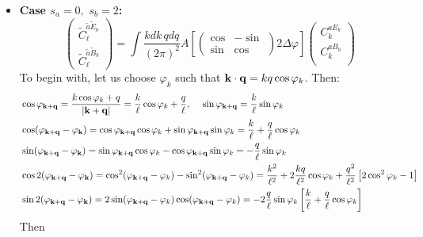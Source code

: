 \documentclass[a4paper,10pt]{article}
\begin{document}
\begin{itemize}
      \item {\bf Case $s_a=0,\,\,s_b=2$:}
        \begin{equation}
          \left(
          \begin{array}{c}
	    \tilde{C}^{\tilde{a}\tilde{E}_b}_\ell\\
	    \tilde{C}^{\tilde{a}\tilde{B}_b}_\ell
	  \end{array}\right)=\int\frac{kdk\,qdq}{(2\pi)^2}
          A\left[\left(
          \begin{array}{cc}
            \cos & -\sin\\
            \sin &  \cos
          \end{array}\right)2\Delta\varphi\right]
          \left(
          \begin{array}{c}
           C^{aE_b}_k \\
           C^{aB_b}_k \\
          \end{array}\right)
        \end{equation}
        To begin with, let us choose $\varphi_k$ such that ${\bf k}\cdot{\bf q}=kq\cos\varphi_k$. Then:
        \begin{align}
          &\cos\varphi_{{\bf k}+{\bf q}}=\frac{k\cos\varphi_k+q}{|{\bf k}+{\bf q}|}=\frac{k}{\ell}\cos\varphi_k+\frac{q}{\ell},\hspace{12pt}
          \sin\varphi_{{\bf k}+{\bf q}}=\frac{k}{\ell}\sin\varphi_k\\
          &\cos(\varphi_{{\bf k}+{\bf q}}-\varphi_{\bf k})=\cos\varphi_{{\bf k}+{\bf q}}\cos\varphi_k+\sin\varphi_{{\bf k}+{\bf q}}\sin\varphi_k=\frac{k}{\ell}+\frac{q}{\ell}\cos\varphi_k\\
          &\sin(\varphi_{{\bf k}+{\bf q}}-\varphi_{\bf k})=\sin\varphi_{{\bf k}+{\bf q}}\cos\varphi_k-\cos\varphi_{{\bf k}+{\bf q}}\sin\varphi_k=-\frac{q}{\ell}\sin\varphi_k\\
          &\cos2(\varphi_{{\bf k}+{\bf q}}-\varphi_{\bf k})=\cos^2(\varphi_{{\bf k}+{\bf q}}-\varphi_k)-\sin^2(\varphi_{{\bf k}+{\bf q}}-\varphi_k)=\frac{k^2}{\ell^2}+2\frac{kq}{\ell^2}\cos\varphi_k+\frac{q^2}{\ell^2}\left[2\cos^2\varphi_k-1\right]\\
          &\sin2(\varphi_{{\bf k}+{\bf q}}-\varphi_{\bf k})=2\sin(\varphi_{{\bf k}+{\bf q}}-\varphi_k)\cos(\varphi_{{\bf k}+{\bf q}}-\varphi_k)=-2\frac{q}{\ell}\sin\varphi_k\left[\frac{k}{\ell}+\frac{q}{\ell}\cos\varphi_k\right]
        \end{align}
        Then
        \begin{align}

\end{align}
\end{itemize}
\end{document}
